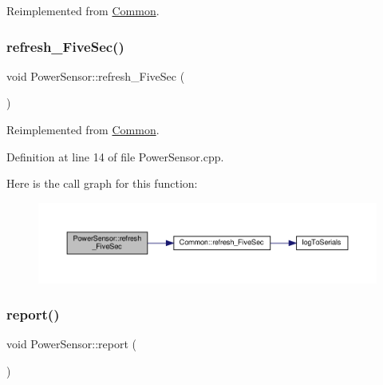 Reimplemented from \hyperlink{class_common_a604ab36b3a1d9a5bcfcb225149c82f90}{Common}.

\mbox{\label{class_power_sensor_a429859d5aa4b72bac2002cda95ac5b21}} 
\subsubsection{\texorpdfstring{refresh\+\_\+\+Five\+Sec()}{refresh\_FiveSec()}\hspace{0.1cm}{\footnotesize\ttfamily [2/2]}}
{\footnotesize\ttfamily void Power\+Sensor\+::refresh\+\_\+\+Five\+Sec (\begin{DoxyParamCaption}{ }\end{DoxyParamCaption})\hspace{0.3cm}{\ttfamily [virtual]}}



Reimplemented from \hyperlink{class_common_a604ab36b3a1d9a5bcfcb225149c82f90}{Common}.



Definition at line 14 of file Power\+Sensor.\+cpp.

Here is the call graph for this function\+:
\nopagebreak
\begin{figure}[H]
\begin{center}
\leavevmode
\includegraphics[width=350pt]{class_power_sensor_a429859d5aa4b72bac2002cda95ac5b21_cgraph}
\end{center}
\end{figure}
\mbox{\label{class_power_sensor_a3cbd46c601175cfe32bb12b9205b0e10}} 
\subsubsection{\texorpdfstring{report()}{report()}\hspace{0.1cm}{\footnotesize\ttfamily [1/2]}}
{\footnotesize\ttfamily void Power\+Sensor\+::report (\begin{DoxyParamCaption}{ }\end{DoxyParamCaption})\hspace{0.3cm}{\ttfamily [virtual]}}



